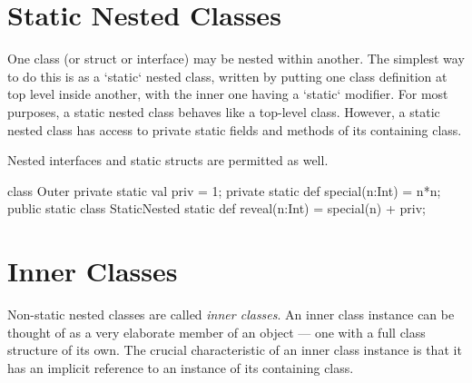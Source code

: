 \section{Static Nested Classes}
\label{StaticNestedClasses}

One class (or struct or interface) may be nested within another.  The simplest
way to do this is as a \xcd`static` nested class, written by putting one class
definition at top level inside another, with the inner one having a
\xcd`static` modifier.  
For most purposes, a static nested class behaves like a top-level class.
However, a static nested class has access to private static
fields and methods of its containing class.  

Nested interfaces and static structs are permitted as well.

\begin{xten}
class Outer {
  private static val priv = 1;
  private static def special(n:Int) = n*n;
  public static class StaticNested {
     static def reveal(n:Int) = special(n) + priv;
  }
}
\end{xten}
%

\section{Inner Classes}
\label{InnerClasses}


Non-static nested classes are called {\em inner classes}. An inner class
instance can be thought of as a very elaborate member of an object --- one
with a full class structure of its own.   The crucial characteristic of an
inner class instance is that it has an implicit reference to an instance of
its containing class.  

